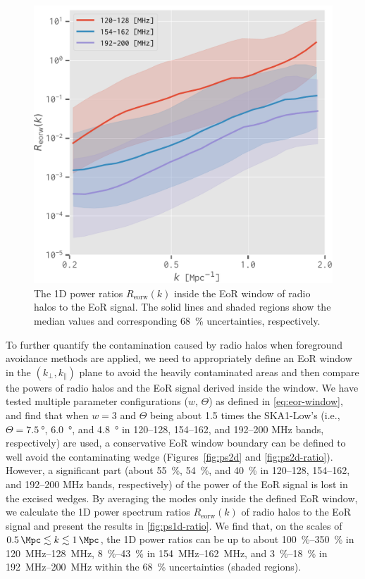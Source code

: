 \documentclass[twocolumn]{aastex62}
\newcommand{\R}[1]{\mathrm{#1}}
\newcommand{\klos}{\text{$k_{\parallel}$}}
\newcommand{\kperp}{\text{$k_{\bot}$}}
\newcommand{\fov}{\text{Fo\!V}}
\newcommand{\editone}[1]{{\leavevmode\color{cyan}#1}}
\begin{document}
\begin{figure}
  \centering
  \includegraphics[width=\columnwidth]{ps1d-ratio-3bands}
  \caption{\label{fig:ps1d-ratio}%
    The 1D power ratios $R_{\R{eorw}}(k)$ inside the EoR window of
    radio halos to the EoR signal.
    The solid lines and shaded regions show the median values and
    corresponding \SI{68}{\percent} uncertainties, respectively.
  }
\end{figure}

To further quantify the contamination caused by radio halos when
foreground avoidance methods are applied, we need to appropriately
define an EoR window in the $(\kperp, \klos)$ plane to avoid the
heavily contaminated areas and then compare the powers of radio halos
and the EoR signal derived inside the window.
We have tested multiple parameter configurations ($w$, $\Theta$) as
defined in \autoref{eq:eor-window}, and find that when $w = 3$ and
$\Theta$ being about 1.5 times the SKA1-Low's \fov{} (i.e.,
$\Theta = \SI{7.5}{\degree}$, \SI{6.0}{\degree}, and \SI{4.8}{\degree}
in \numrange{120}{128}, \numrange{154}{162}, and \numrange{192}{200}
\si{\MHz} bands, respectively) are used, a conservative EoR window
boundary can be defined to well avoid the contaminating wedge
(Figures~\ref{fig:ps2d} and \ref{fig:ps2d-ratio}).
However, a significant part (about \SI{55}{\percent}, \SI{54}{\percent},
and \SI{40}{\percent} in \numrange{120}{128}, \numrange{154}{162},
and \numrange{192}{200} \si{\MHz} bands, respectively) of the power of
the EoR signal is lost in the excised wedges.
By averaging the modes only inside the defined EoR window, we calculate
the 1D power spectrum ratios $R_{\R{eorw}}(k)$ of radio halos to the EoR
signal and present the results in \autoref{fig:ps1d-ratio}.
We find that, on the scales of
$\SI{0.5}{\per\Mpc} \lesssim k \lesssim \SI{1}{\per\Mpc}$,
the 1D power ratios can be up to about
\editone{%
\SIrange{100}{350}{\percent} in \SIrange{120}{128}{\MHz},
\SIrange{8}{43}{\percent} in \SIrange{154}{162}{\MHz}, and
\SIrange{3}{18}{\percent} in \SIrange{192}{200}{\MHz}}
within the \SI{68}{\percent} uncertainties (shaded regions).
\end{document}

